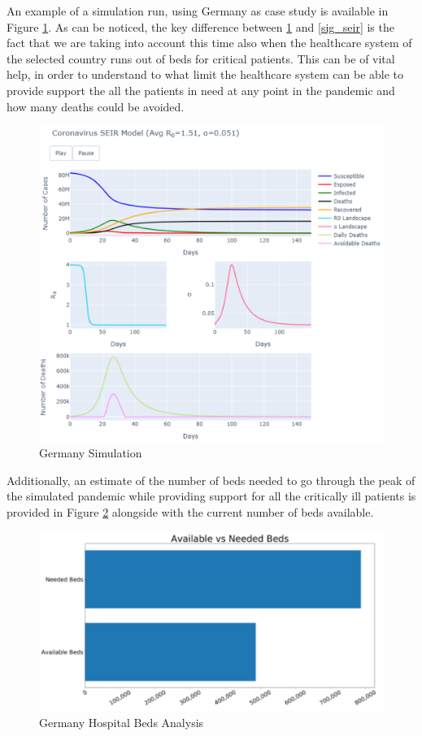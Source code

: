 An example of a simulation run, using Germany as case study is available in Figure \ref{germ_sim}. As can be noticed, the key difference between \ref{germ_sim} and \ref{sig_seir} is the fact that we are taking into account this time also when the healthcare system of the selected country runs out of beds for critical patients. This can be of vital help, in order to understand to what limit the healthcare system can be able to provide support the all the patients in need at any point in the pandemic and how many deaths could be avoided.
\vspace{-0.3cm}
\begin{figure}[ht!]%
    \centering
    \includegraphics[width=0.85\linewidth]{latex/images/cov_g2.pdf}
    \vspace{-0.3cm}
    \caption{Germany Simulation}
    \label{germ_sim}
\end{figure}

Additionally, an estimate of the number of beds needed to go through the peak of the simulated pandemic while providing support for all the critically ill patients is provided in Figure \ref{germ_bed} alongside with the current number of beds available.

\vspace{-0.3cm}
\begin{figure}[ht!]%
    \centering
    \includegraphics[width=0.65\linewidth]{latex/images/cov_g3.pdf}
    \vspace{-0.3cm}
    \caption{Germany Hospital Beds Analysis}
    \label{germ_bed}
    \vspace{-0.3cm}
\end{figure}

